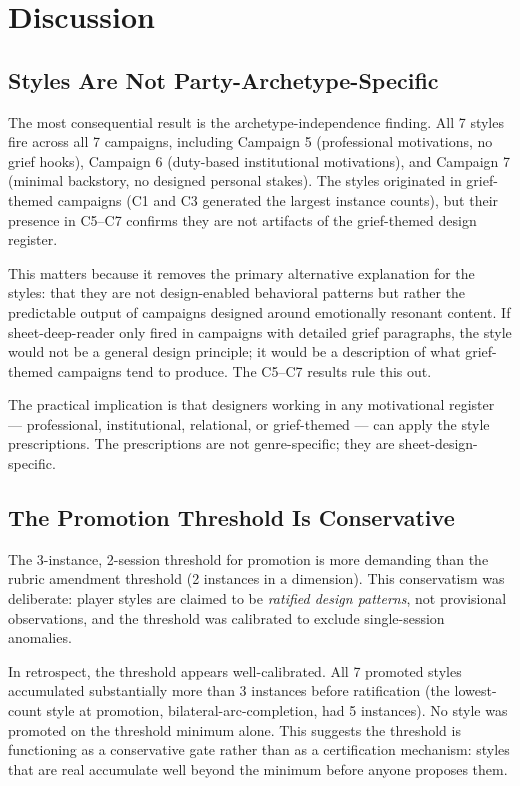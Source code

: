 
\section{Discussion}
\label{sec:discussion}

\subsection{Styles Are Not Party-Archetype-Specific}

The most consequential result is the archetype-independence finding. All 7 styles fire
across all 7 campaigns, including Campaign 5 (professional motivations, no grief hooks),
Campaign 6 (duty-based institutional motivations), and Campaign 7 (minimal backstory,
no designed personal stakes). The styles originated in grief-themed campaigns (C1 and
C3 generated the largest instance counts), but their presence in C5--C7 confirms they
are not artifacts of the grief-themed design register.

This matters because it removes the primary alternative explanation for the styles:
that they are not design-enabled behavioral patterns but rather the predictable output
of campaigns designed around emotionally resonant content. If sheet-deep-reader only
fired in campaigns with detailed grief paragraphs, the style would not be a general
design principle; it would be a description of what grief-themed campaigns tend to
produce. The C5--C7 results rule this out.

The practical implication is that designers working in any motivational register ---
professional, institutional, relational, or grief-themed --- can apply the style
prescriptions. The prescriptions are not genre-specific; they are sheet-design-specific.

\subsection{The Promotion Threshold Is Conservative}

The 3-instance, 2-session threshold for promotion is more demanding than the rubric
amendment threshold (2 instances in a dimension). This conservatism was deliberate:
player styles are claimed to be \textit{ratified design patterns}, not provisional
observations, and the threshold was calibrated to exclude single-session anomalies.

In retrospect, the threshold appears well-calibrated. All 7 promoted styles accumulated
substantially more than 3 instances before ratification (the lowest-count style at
promotion, bilateral-arc-completion, had 5 instances). No style was promoted on the
threshold minimum alone. This suggests the threshold is functioning as a conservative
gate rather than as a certification mechanism: styles that are real accumulate well
beyond the minimum before anyone proposes them.


